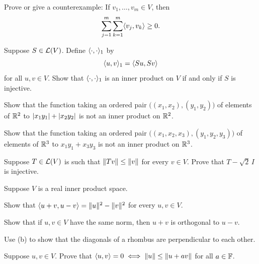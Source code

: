 \begin{exc}

\begin{exercise}
Prove or give a counterexample: If $v_1,\dots,v_m\in V$, then
\[ \sum_{j=1}^m\sum_{k=1}^m\langle v_j, v_k \rangle \ge 0. \]
\end{exercise}

\begin{exercise}
Suppose $S\in\mathcal{L}(V)$. Define $\langle \cdot, \cdot \rangle_1$ by
\[ \langle u, v \rangle_1 = \langle Su, Sv \rangle \]
for all $u,v\in V$. Show that $\langle \cdot, \cdot \rangle_1$ is an inner product on $V$
if and only if $S$ is injective.
\end{exercise}

\begin{exercise}\leavevmode
\begin{parts}
\item Show that the function taking an ordered pair
  $\bigl((x_1,x_2),(y_1,y_2)\bigr)$ of elements of $\mathbb{R}^2$ to
  $\lvert x_1y_1 \rvert+\lvert x_2y_2 \rvert$ is not an inner product on $\mathbb{R}^2$.
\item Show that the function taking an ordered pair
  $\bigl((x_1,x_2,x_3),(y_1,y_2,y_3)\bigr)$ of elements of $\mathbb{R}^3$ to
  $x_1y_1+x_3y_3$ is not an inner product on $\mathbb{R}^3$.
\end{parts}
\end{exercise}

\begin{exercise}
Suppose $T\in\mathcal{L}(V)$ is such that $\lVert Tv \rVert\le\lVert v \rVert$ for every $v\in V$.
Prove that $T-\sqrt2\,I$ is injective.
\end{exercise}

\begin{exercise}
Suppose $V$ is a real inner product space.
\begin{parts}
\item Show that $\langle u+v, u-v \rangle=\lVert u \rVert^2-\lVert v \rVert^2$ for every $u,v\in V$.
\item Show that if $u,v\in V$ have the same norm, then $u+v$ is orthogonal to
  $u-v$.
\item Use (b) to show that the diagonals of a rhombus are perpendicular to each
  other.
\end{parts}
\end{exercise}

\begin{exercise}
Suppose $u,v\in V$. Prove that
$\langle u, v \rangle=0 \iff \lVert u \rVert\le\lVert u+av \rVert$ for all $a\in\mathbb{F}$.
\end{exercise}


\end{exc}
